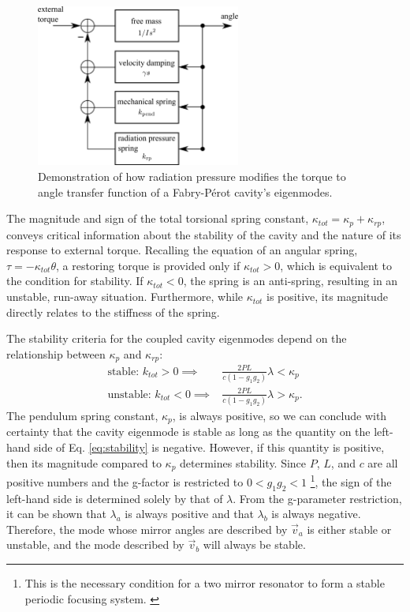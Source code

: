 \begin{figure}
\begin{centering}
\includegraphics[width=0.6\textwidth]{figures/pendulumLoop.pdf}
\caption[Controls view of addition of radiation pressure to the pendulum
transfer function]{Demonstration of how radiation pressure modifies the torque to
  angle transfer function of a Fabry-P\'{e}rot cavity's eigenmodes.}
\label{fig:pendloop}
\end{centering}
\end{figure}

The magnitude and sign of the total torsional spring constant,
$\kappa_{tot} = \kappa_p + \kappa_{rp}$, conveys critical information
about the stability of the cavity and the nature of its response to
external torque. Recalling the equation of an angular spring, $\tau =
- \kappa_{tot} \theta$, a restoring torque is provided only if
$\kappa_{tot} > 0$, which is equivalent to the condition for
stability. If $\kappa_{tot} < 0$, the spring is an anti-spring,
resulting in an unstable, run-away situation. Furthermore, 
while $\kappa_{tot}$ is positive, its magnitude directly relates to
the stiffness of the spring.

The stability criteria for the coupled cavity eigenmodes 
depend on the relationship between $\kappa_p$ and $\kappa_{rp}$:
\begin{align}
\mbox{stable: } k_{tot} > 0 \implies & \frac{2 P L}{c (1-g_1 g_2)} \lambda < \kappa_p \\
\mbox{unstable: } k_{tot} < 0 \implies & \frac{2 P L}{c (1-g_1 g_2)} \lambda > \kappa_p.
\label{eq:stability}
\end{align}
The pendulum spring constant, $\kappa_p$, is always positive, so we
can conclude with certainty that the cavity eigenmode is stable as
long as the quantity on the left-hand side of Eq. \ref{eq:stability}
is negative. However, if this quantity is positive, then its magnitude
compared to $\kappa_p$ determines stability. Since $P$, $L$, and $c$
are all positive numbers and the g-factor is restricted to $0 < g_1g_2
< 1$ \footnote{This is the necessary condition for a two mirror
  resonator to form a stable periodic focusing
  system. \cite[p. 747]{Siegman1986Lasers}}, the sign of the left-hand
side is determined solely by that of $\lambda$. From the g-parameter
restriction, it can be shown that $\lambda_a$ is always positive and
that $\lambda_b$ is always negative. Therefore, the mode whose mirror
angles are described by $\vec{v}_a$ is either stable or unstable, and
the mode described by $\vec{v}_b$ will always be stable.

